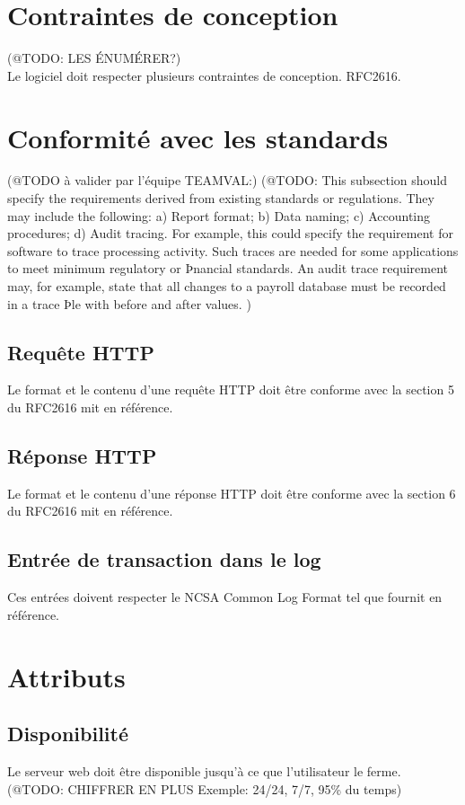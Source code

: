 \documentclass{scrreprt}
\begin{document}
\section{Contraintes de conception}(@TODO: LES ÉNUMÉRER?)\\ Le logiciel doit respecter plusieurs contraintes de conception. RFC2616.
\section{Conformité avec les standards}
(@TODO à valider par l'équipe TEAMVAL:)
(@TODO: This subsection should specify the requirements derived from existing standards or regulations. They may
include the following:
   a)    Report format;
   b)    Data naming;
   c)    Accounting procedures;
   d)    Audit tracing.
For example, this could specify the requirement for software to trace processing activity. Such traces are
needed for some applications to meet minimum regulatory or Þnancial standards. An audit trace requirement
may, for example, state that all changes to a payroll database must be recorded in a trace Þle with before and
after values.
)
\subsection{Requête HTTP}
Le format et le contenu d'une requête HTTP doit être conforme avec la section 5 du RFC2616\cite{http1.0} mit en référence.
\subsection{Réponse HTTP}
Le format et le contenu d'une réponse HTTP doit être conforme avec la section 6 du RFC2616\cite{http1.0} mit en référence.
\subsection{Entrée de transaction dans le log}
Ces entrées doivent respecter le NCSA Common Log Format\cite{NCSA} tel que fournit en référence.



\section{Attributs}
\subsection{Disponibilité}
Le serveur web doit être disponible jusqu'à ce que l'utilisateur le ferme. \\
(@TODO: CHIFFRER EN PLUS Exemple: 24/24, 7/7, 95\% du temps)
\end{document}
